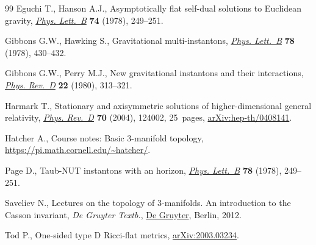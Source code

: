 \documentclass[10pt,a4paper]{amsart}
\numberwithin{equation}{section}
\begin{document}
\begin{thebibliography}{99}
Eguchi T., Hanson A.J., Asymptotically flat self-dual solutions to {E}uclidean
 gravity, \href{https://doi.org/10.1016/0370-2693(78)90566-X}{\textit{Phys. Lett.~B}} \textbf{74} (1978), 249--251.

Gibbons G.W., Hawking S., Gravitational multi-instantons, \href{https://doi.org/10.1016/0370-2693(78)90478-1}{\textit{Phys.
 Lett.~B}} \textbf{78} (1978), 430--432.

Gibbons G.W., Perry M.J., New gravitational instantons and their interactions,
 \href{https://doi.org/10.1103/PhysRevD.22.313}{\textit{Phys. Rev.~D}} \textbf{22} (1980), 313--321.

Harmark T., Stationary and axisymmetric solutions of higher-dimensional general
 relativity, \href{https://doi.org/10.1103/PhysRevD.70.124002}{\textit{Phys. Rev.~D}} \textbf{70} (2004), 124002, 25~pages,
 \href{https://arxiv.org/abs/hep-th/0408141}{arXiv:hep-th/0408141}.

Hatcher A., Course notes: {B}asic 3-manifold topology,
 \url{https://pi.math.cornell.edu/~hatcher/}.

Page D., Taub-{NUT} instantons with an horizon, \href{https://doi.org/10.1016/0370-2693(78)90016-3}{\textit{Phys. Lett.~B}}
 \textbf{78} (1978), 249--251.

Saveliev N., Lectures on the topology of 3-manifolds. {A}n introduction to the
 {C}asson invariant, \textit{{D}e Gruyter Textb.}, \href{https://doi.org/10.1515/9783110250367}{{D}e Gruyter}, Berlin, 2012.

Tod P., One-sided type {D} {R}icci-flat metrics, \href{https://arxiv.org/abs/2003.03234}{arXiv:2003.03234}.

\end{thebibliography}
\end{document}

